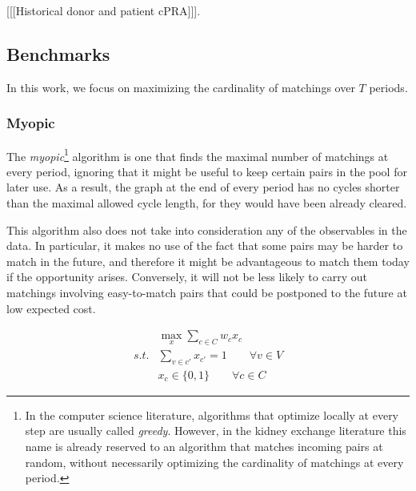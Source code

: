 \documentclass[12pt]{article}
\begin{document}




[[[Historical donor and patient cPRA]]].



\subsection{Benchmarks}


In this work, we focus on maximizing the cardinality of matchings over $T$ periods. 




\subsubsection{Myopic}

The \emph{myopic}\footnote{In the computer science literature, algorithms that optimize locally at every step are usually called \emph{greedy}. However, in the kidney exchange literature this name is already reserved to an algorithm that matches incoming pairs at random, without necessarily optimizing the cardinality of matchings at every period.} algorithm is one that finds the maximal number of matchings at every period, ignoring that it might be useful to keep certain pairs in the pool for later use. As a result, the graph at the end of every period has no cycles shorter than the maximal allowed cycle length, for they would have been already cleared.

This algorithm also does not take into consideration any of the observables in the data. In particular, it makes no use of the fact that some pairs may be harder to match in the future, and therefore it might be advantageous to match them today if the opportunity arises. Conversely, it will not be less likely to carry out matchings involving easy-to-match pairs that could be postponed to the future at low expected cost.

\begin{align}
   &\max_{x} \sum_{c \in C} w_{c} x_{c} \\
      s.t. &\sum_{v \in c'} x_{c'} = 1 \qquad \forall v \in V\\
        &x_c \in \{ 0, 1\}  \qquad \forall c \in C
\end{align}
\end{document}
